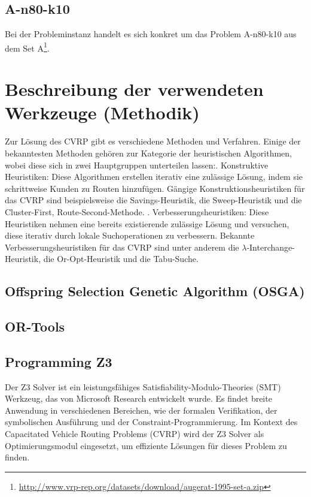 \documentclass{IEEEtran}
\begin{document}
    \subsection{A-n80-k10}
    Bei der Probleminstanz handelt es sich konkret um das Problem A-n80-k10 aus dem Set A\footnote{\url{http://www.vrp-rep.org/datasets/download/augerat-1995-set-a.zip}}. 
    

\section{Beschreibung der verwendeten Werkzeuge (Methodik)}
    Zur Lösung des CVRP gibt es verschiedene Methoden und Verfahren. 
    Einige der bekanntesten Methoden gehören zur Kategorie der heuristischen
    Algorithmen, wobei diese sich in zwei Hauptgruppen
    unterteilen lassen:\newline{}. Konstruktive Heuristiken: Diese Algorithmen erstellen iterativ eine zulässige 
    Lösung, indem sie schrittweise Kunden zu Routen hinzufügen. Gängige 
    Konstruktionsheuristiken für das CVRP sind beispielsweise die Savings-Heuristik, 
    die Sweep-Heuristik und die Cluster-First, Route-Second-Methode. \newline{}. Verbesserungsheuristiken: Diese Heuristiken nehmen eine bereits existierende 
    zulässige Lösung und versuchen, diese iterativ durch lokale Suchoperationen zu 
    verbessern. Bekannte Verbesserungsheuristiken für das CVRP sind unter anderem die 
    $\lambda$-Interchange-Heuristik, die Or-Opt-Heuristik und die Tabu-Suche.
\subsection{Offspring Selection Genetic Algorithm (OSGA)}

\subsection{OR-Tools}

\subsection{Programming Z3}
Der Z3 Solver ist ein leistungsfähiges Satisfiability-Modulo-Theories (SMT) Werkzeug, 
das von Microsoft Research entwickelt wurde. Es findet breite Anwendung in verschiedenen 
Bereichen, wie der formalen Verifikation, der symbolischen Ausführung und der 
Constraint-Programmierung. Im Kontext des Capacitated Vehicle Routing Problems (CVRP) wird
der Z3 Solver als Optimierungsmodul eingesetzt, um effiziente Lösungen für dieses Problem
zu finden.
\end{document}
